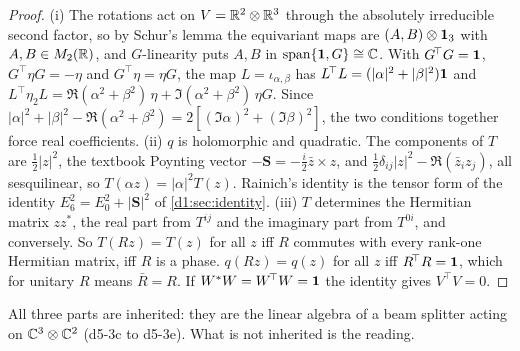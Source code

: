 \begin{proof}
(i) The rotations act on $V=\mathbb{R}^2\otimes\mathbb{R}^3$ through the absolutely irreducible second factor, so by Schur's lemma \cite{Schur} the equivariant maps
are $(A,B)\otimes\mathbf 1_3$ with $A,B\in M_2(\mathbb{R})$, and $G$-linearity puts $A,B$ in $\operatorname{span}\{\mathbf 1,G\}\cong\mathbb{C}$. With $G^{\!\top}G=\mathbf 1$,
$G^{\!\top}\eta G=-\eta$ and $G^{\!\top}\eta=\eta G$, the map $L=\iota_{\alpha,\beta}$ has $L^{\!\top}L=(|\alpha|^2+|\beta|^2)\mathbf 1$ and
$L^{\!\top}\eta_2L=\Re(\alpha^2+\beta^2)\,\eta+\Im(\alpha^2+\beta^2)\,\eta G$. Since $|\alpha|^2+|\beta|^2-\Re(\alpha^2+\beta^2)=2[(\Im\alpha)^2+(\Im\beta)^2]$, the two
conditions together force real coefficients. (ii) $q$ is holomorphic and quadratic. The components of $T$ are $\tfrac12|z|^2$,
the textbook Poynting vector $-\mathbf S=-\tfrac i2\bar z\times z$, and $\tfrac12\delta_{ij}|z|^2-\Re(\bar z_iz_j)$, all sesquilinear, so $T(\alpha z)=|\alpha|^2T(z)$. Rainich's identity is the
tensor form of the identity $E_6^2=E_0^2+|\mathbf S|^2$ of \cref{d1:sec:identity}. (iii) $T$ determines the Hermitian matrix $zz^*$, the real part from $T^{ij}$ and
the imaginary part from $T^{0i}$, and conversely. So $T(Rz)=T(z)$ for all $z$ iff $R$ commutes with every rank-one Hermitian matrix, iff $R$ is a
phase. $q(Rz)=q(z)$ for all $z$ iff $R^{\!\top}R=\mathbf 1$, which for unitary $R$ means $\bar R=R$. If $W^*W=W^{\!\top}W=\mathbf 1$ the identity gives
$V^{\!\top}V=0$.
\end{proof}

All three parts are inherited: they are the linear algebra of a beam splitter acting on $\mathbb{C}^3\otimes\mathbb{C}^2$ (d5-3c to d5-3e). What is not
inherited is the reading.

